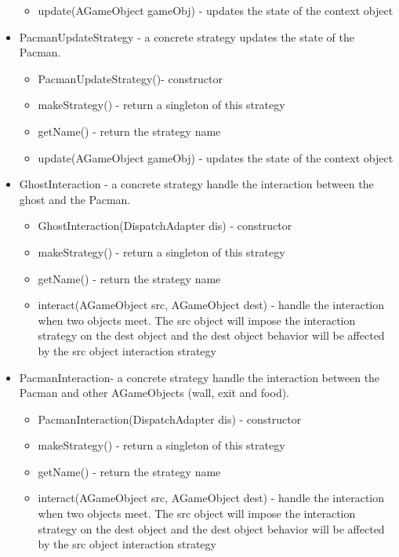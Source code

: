 \documentclass[letterpaper, 11pt]{article}
\begin{document}
\begin{itemize}
\begin{itemize}
  \item update(AGameObject gameObj) - updates the state of the context object
  \end{itemize}
 \item PacmanUpdateStrategy - a concrete strategy updates the state of the Pacman.
  \begin{itemize}
  \item PacmanUpdateStrategy()- constructor
  \item makeStrategy() - return a singleton of this strategy
  \item getName() - return the strategy name
  \item update(AGameObject gameObj) - updates the state of the context object
  \end{itemize}
\item GhostInteraction - a concrete strategy handle the interaction between the ghost and the Pacman.
  \begin{itemize}
  \item GhostInteraction(DispatchAdapter dis) - constructor
  \item makeStrategy() - return a singleton of this strategy
  \item getName() - return the strategy name
  \item interact(AGameObject src, AGameObject dest) - handle the interaction when two objects meet. The src object will impose the interaction strategy on the dest object and the dest object behavior will be affected by the src object interaction strategy
  \end{itemize}
  \item PacmanInteraction- a concrete strategy handle the interaction between the Pacman and other AGameObjects (wall, exit and food).
  \begin{itemize}
  \item PacmanInteraction(DispatchAdapter dis) - constructor
  \item makeStrategy() - return a singleton of this strategy
  \item getName() - return the strategy name
  \item interact(AGameObject src, AGameObject dest) - handle the interaction when two objects meet. The src object will impose the interaction strategy on the dest object and the dest object behavior will be affected by the src object interaction strategy
  \end{itemize}
\end{itemize}
\end{document}
